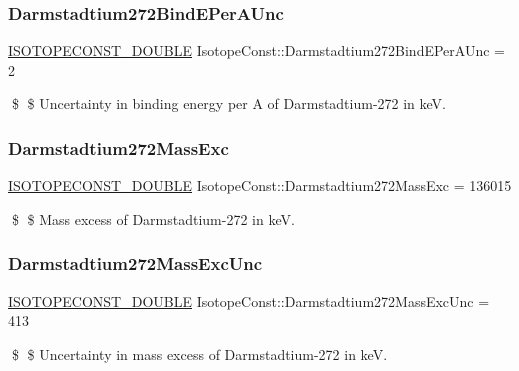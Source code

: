 \subsubsection{\texorpdfstring{Darmstadtium272\+Bind\+E\+Per\+A\+Unc}{Darmstadtium272BindEPerAUnc}}
{\footnotesize\ttfamily \mbox{\hyperlink{group___isotope_const-_macros_ga8f45a7272ce02c0b4c65c44636ed719a}{I\+S\+O\+T\+O\+P\+E\+C\+O\+N\+S\+T\+\_\+\+D\+O\+U\+B\+LE}} Isotope\+Const\+::\+Darmstadtium272\+Bind\+E\+Per\+A\+Unc = 2}

\$ \$ Uncertainty in binding energy per A of Darmstadtium-\/272 in keV. \mbox{\label{group___isotope_const-_darmstadtium-_ds272_ga219a7f081bc878412ee93c94bae564d1}} 
\subsubsection{\texorpdfstring{Darmstadtium272\+Mass\+Exc}{Darmstadtium272MassExc}}
{\footnotesize\ttfamily \mbox{\hyperlink{group___isotope_const-_macros_ga8f45a7272ce02c0b4c65c44636ed719a}{I\+S\+O\+T\+O\+P\+E\+C\+O\+N\+S\+T\+\_\+\+D\+O\+U\+B\+LE}} Isotope\+Const\+::\+Darmstadtium272\+Mass\+Exc = 136015}

\$ \$ Mass excess of Darmstadtium-\/272 in keV. \mbox{\label{group___isotope_const-_darmstadtium-_ds272_gac0844efbf45c4c605e69721546b4f661}} 
\subsubsection{\texorpdfstring{Darmstadtium272\+Mass\+Exc\+Unc}{Darmstadtium272MassExcUnc}}
{\footnotesize\ttfamily \mbox{\hyperlink{group___isotope_const-_macros_ga8f45a7272ce02c0b4c65c44636ed719a}{I\+S\+O\+T\+O\+P\+E\+C\+O\+N\+S\+T\+\_\+\+D\+O\+U\+B\+LE}} Isotope\+Const\+::\+Darmstadtium272\+Mass\+Exc\+Unc = 413}

\$ \$ Uncertainty in mass excess of Darmstadtium-\/272 in keV. \mbox{\label{group___isotope_const-_darmstadtium-_ds272_ga94873fd94e5256328cf78ccdf717cfd7}} 
